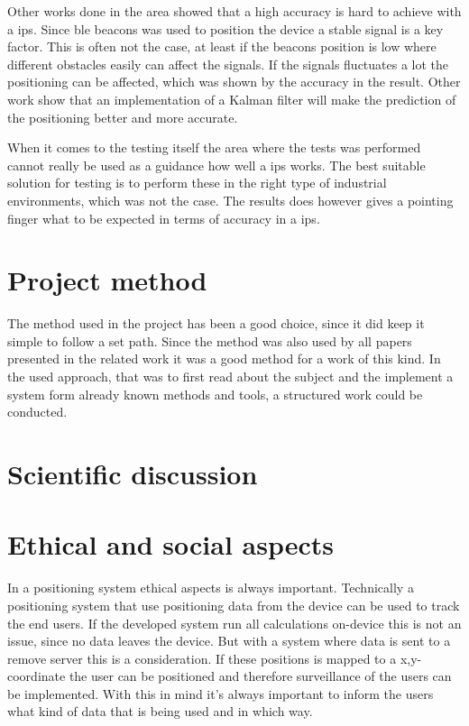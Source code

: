 \bigskip

Other works done in the area showed that a high accuracy is hard to achieve with a \acrshort{ips}.
Since \acrlong{ble} beacons was used to position the device a stable signal is a key factor.
This is often not the case, at least if the beacons position is low where different obstacles easily can affect the signals.
If the signals fluctuates a lot the positioning can be affected, which was shown by the accuracy in the result.
Other work show that an implementation of a Kalman filter will make the prediction of the positioning better and more accurate.

\bigskip

When it comes to the testing itself the area where the tests was performed cannot really be used as a guidance how well a \acrshort{ips} works.
The best suitable solution for testing is to perform these in the right type of industrial environments, which was not the case.
The results does however gives a pointing finger what to be expected in terms of accuracy in a \acrshort{ips}.


\section{Project method}\label{sec:discussionMethod}
The method used in the project has been a good choice, since it did keep it simple to follow a set path.
Since the method was also used by all papers presented in the related work it was a good method for a work of this kind.
In the used approach, that was to first read about the subject and the implement a system form already known methods and tools, a structured work could be conducted.


\section{Scientific discussion}\label{sec:discussionSientific}




\section{Ethical and social aspects}\label{sec:discussionAspects}
In a positioning system ethical aspects is always important.
Technically a positioning system that use positioning data from the device can be used to track the end users.
If the developed system run all calculations on-device this is not an issue, since no data leaves the device.
But with a system where data is sent to a remove server this is a consideration.
If these positions is mapped to a x,y-coordinate the user can be positioned and therefore surveillance of the users can be implemented.
With this in mind it's always important to inform the users what kind of data that is being used and in which way.

